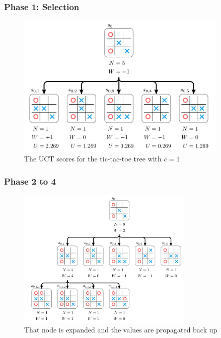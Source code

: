 \documentclass[notheorems, aspectratio=54]{beamer}
\begin{document}
\begin{frame}
    \frametitle{Phase 1: Selection}

    \begin{figure}
        \includegraphics[width=0.9\textwidth]{fig/mcts_selection.png}
        \caption{The UCT scores for the tic-tac-toe tree with $c=1$}
    \end{figure}
\end{frame}

\begin{frame}
    \frametitle{Phase 2 to 4}

    \begin{figure}
        \includegraphics[width=0.75\textwidth]{fig/mcts_2_to_4.png}
        \caption{That node is expanded and the values are propagated back up}
    \end{figure}
\end{frame}
\end{document}

